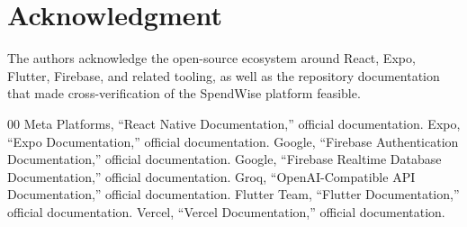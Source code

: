 \documentclass[conference]{IEEEtran}
\begin{document}
\section*{Acknowledgment}
The authors acknowledge the open-source ecosystem around React, Expo, Flutter, Firebase, and related tooling, as well as the repository documentation that made cross-verification of the SpendWise platform feasible.

\begin{thebibliography}{00}
 Meta Platforms, ``React Native Documentation,'' official documentation.
 Expo, ``Expo Documentation,'' official documentation.
 Google, ``Firebase Authentication Documentation,'' official documentation.
 Google, ``Firebase Realtime Database Documentation,'' official documentation.
 Groq, ``OpenAI-Compatible API Documentation,'' official documentation.
 Flutter Team, ``Flutter Documentation,'' official documentation.
 Vercel, ``Vercel Documentation,'' official documentation.
\end{thebibliography}
\end{document}
